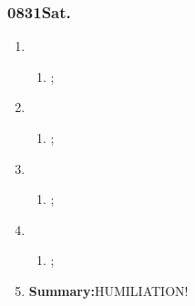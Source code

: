 \subsubsection{0831Sat.}
\begin{enumerate}
	\item \ncquaone
	\begin{enumerate}[(1)]
		\item ;\rightundoneBlack
	\end{enumerate}
	
	\item \ncquatwo	
	\begin{enumerate}[(1)]
		\item ;\rightundoneBlack
	\end{enumerate}
	
	\item \ncquathree
	\begin{enumerate}[(1)]
		\item ;\rightundoneBlack
	\end{enumerate}
	
	\item \ncquafour	
	\begin{enumerate}[(1)]
		\item ;\rightundoneBlack
	\end{enumerate}
	\item \textbf{Summary:}HUMILIATION! 
\end{enumerate}
